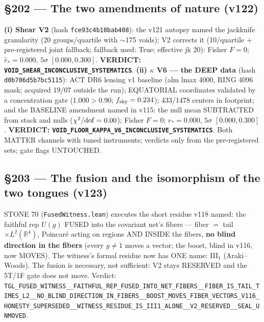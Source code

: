 \documentclass[11pt]{article}
\theoremstyle{definition}\newtheorem{deriv}{Derivation}
\begin{document}
\subsection*{\S202 --- The two amendments of nature (v122)}\textbf{(i) Shear V2} (hash \texttt{fce93c4b18bab408}): the v121 autopsy named the jackknife granularity (20 groups/quartile with $\sim$175 voids); V2 corrects it (10/quartile $+$ pre-registered joint fallback; fallback used: True; effective jk 20): Fisher $F=0$; $\hat r_*=0.000$, $5\sigma$ $[0.000,0.300]$. \textbf{VERDICT: \texttt{VOID\_SHEAR\_INCONCLUSIVE\_SYSTEMATICS}}. \textbf{(ii) $\kappa$ V6 --- the DEEP data} (hash \texttt{d0b706d5b7bc5115}): ACT DR6 lensing v1 baseline (alm lmax 4000, RING 4096 mask; acquired 19/07 outside the run); EQUATORIAL coordinates validated by a concentration gate (1.000$>$0.90; $f_{\rm sky}=0.234$); 433/1478 centers in footprint; and the BASELINE amendment named in v115: the null mean SUBTRACTED from stack and nulls ($\chi^2/{\rm dof}=0.00$); Fisher $F=0$; $\hat r_*=0.000$, $5\sigma$ $[0.000,0.300]$. \textbf{VERDICT: \texttt{VOID\_FLOOR\_KAPPA\_V6\_INCONCLUSIVE\_SYSTEMATICS}}. Both MATTER channels with tuned instruments; verdicts only from the pre-registered sets; gate flags UNTOUCHED.

\subsection*{\S203 --- The fusion and the isomorphism of the two tongues (v123)}STONE 70 (\texttt{FusedWitness.lean}) executes the short residue v118 named: the faithful rep $U(g)$ FUSED into the covariant net's fibers --- fiber $=$ tail $\times L^2(\mathbb{R}^4)$, Poincaré acting on regions AND INSIDE the fibers, \textbf{no blind direction in the fibers} (every $g\neq1$ moves a vector; the boost, blind in v116, now MOVES). The witness's formal residue now has ONE name: III$_1$ (Araki--Woods). The fusion is necessary, not sufficient: V2 stays RESERVED and the 5T/1F gate does not move. Verdict: \texttt{TGL\_FUSED\_WITNESS\_\_FAITHFUL\_REP\_FUSED\_INTO\_NET\_FIBERS\_\_FIBER\_IS\_TAIL\_TIMES\_L2\_\_NO\_BLIND\_DIRECTION\_IN\_FIBERS\_\_BOOST\_MOVES\_FIBER\_VECTORS\_V116\_HONESTY\_SUPERSEDED\_\_WITNESS\_RESIDUE\_IS\_III1\_ALONE\_\_V2\_RESERVED\_\_SEAL\_UNMOVED}.
\end{document}
